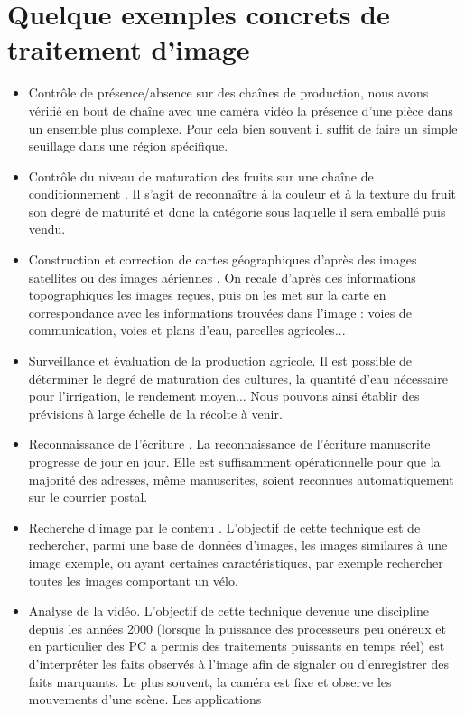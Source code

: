 \documentclass[11pt]{report}
\begin{document}
\section{Quelque exemples concrets de traitement d’image}
\begin{itemize}
\item Contrôle de présence/absence sur des chaînes de production, nous avons vérifié
en bout de chaîne avec une caméra vidéo la présence d'une pièce dans un ensemble
plus complexe. Pour cela bien souvent il suffit de faire un simple seuillage dans une
région spécifique.
\item
Contrôle du niveau de maturation des fruits sur une chaîne de
conditionnement . Il s'agit de reconnaître à la couleur et à la texture du fruit son
degré de maturité et donc la catégorie sous laquelle il sera emballé puis vendu.
\item
Construction et correction de cartes géographiques d'après des images
satellites ou des images aériennes . On recale d'après des informations
topographiques les images reçues, puis on les met sur la carte en correspondance
avec les informations trouvées dans l'image : voies de communication, voies et plans
d'eau, parcelles agricoles...
\item Surveillance et évaluation de la production agricole. Il est possible de
déterminer le degré de maturation des cultures, la quantité d'eau nécessaire pour
l'irrigation, le rendement moyen... Nous pouvons ainsi établir des prévisions à large
échelle de la récolte à venir.
\item
Reconnaissance de l'écriture . La reconnaissance de l'écriture manuscrite
progresse de jour en jour. Elle est suffisamment opérationnelle pour que la majorité
des adresses, même manuscrites, soient reconnues automatiquement sur le courrier
postal.
\item
Recherche d'image par le contenu . L'objectif de cette technique est de
rechercher, parmi une base de données d'images, les images similaires à une image
exemple, ou ayant certaines caractéristiques, par exemple rechercher toutes les
images comportant un vélo.
\item
Analyse de la vidéo. L'objectif de cette technique devenue une discipline depuis les
années 2000 (lorsque la puissance des processeurs peu onéreux et en particulier des
PC a permis des traitements puissants en temps réel) est d'interpréter les faits
observés à l'image afin de signaler ou d'enregistrer des faits marquants. Le plus
souvent, la caméra est fixe et observe les mouvements d'une scène. Les applications

\end{itemize}
\end{document}
